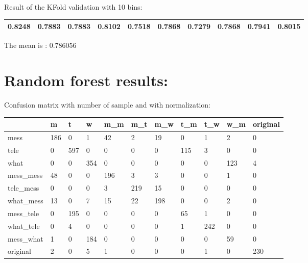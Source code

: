 Result of the KFold validation with 10 bins:
 {\def\arraystretch{1.3} 
 \begin{table}[H] 
\centering 
\begin{tabular}{|l |l |l |l |l |l |l |l |l |l |}  
\hline 
0.8248&
0.7883&
0.7883&
0.8102&
0.7518&
0.7868&
0.7279&
0.7868&
0.7941&
0.8015\\ \hline  

\end{tabular} 
\end{table} }

The mean is : 0.786056\section{Random forest results:} 
Confusion matrix with number of sample and with normalization:
 {\def\arraystretch{1.3} 
 \begin{table}[H] 
\centering 
\begin{tabular}{|l|l|l|l|l|l|l|l|l|l|l|} 
\hline 
  &m  &t  &w  &m\_m  &m\_t  &m\_w  &t\_m  &t\_w  &w\_m  &original  \\ \hline
mess  &186  &0  &1  &42  &2  &19  &0  &1  &2  &0  \\ \hline
tele  &0  &597  &0  &0  &0  &0  &115  &3  &0  &0  \\ \hline
what  &0  &0  &354  &0  &0  &0  &0  &0  &123  &4  \\ \hline
mess\_mess  &48  &0  &0  &196  &3  &3  &0  &0  &1  &0  \\ \hline
tele\_mess  &0  &0  &0  &3  &219  &15  &0  &0  &0  &0  \\ \hline
what\_mess  &13  &0  &7  &15  &22  &198  &0  &0  &2  &0  \\ \hline
mess\_tele  &0  &195  &0  &0  &0  &0  &65  &1  &0  &0  \\ \hline
what\_tele  &0  &4  &0  &0  &0  &0  &1  &242  &0  &0  \\ \hline
mess\_what  &1  &0  &184  &0  &0  &0  &0  &0  &59  &0  \\ \hline
original  &2  &0  &5  &1  &0  &0  &0  &1  &0  &230  \\ \hline
\end{tabular} 
\end{table} }

